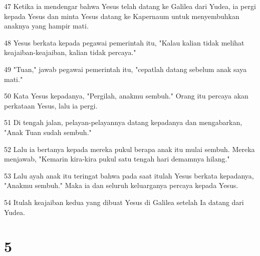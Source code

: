 \par 47 Ketika ia mendengar bahwa Yesus telah datang ke Galilea dari Yudea, ia pergi kepada Yesus dan minta Yesus datang ke Kapernaum untuk menyembuhkan anaknya yang hampir mati.
\par 48 Yesus berkata kepada pegawai pemerintah itu, "Kalau kalian tidak melihat keajaiban-keajaiban, kalian tidak percaya."
\par 49 "Tuan," jawab pegawai pemerintah itu, "cepatlah datang sebelum anak saya mati."
\par 50 Kata Yesus kepadanya, "Pergilah, anakmu sembuh." Orang itu percaya akan perkataan Yesus, lalu ia pergi.
\par 51 Di tengah jalan, pelayan-pelayannya datang kepadanya dan mengabarkan, "Anak Tuan sudah sembuh."
\par 52 Lalu ia bertanya kepada mereka pukul berapa anak itu mulai sembuh. Mereka menjawab, "Kemarin kira-kira pukul satu tengah hari demamnya hilang."
\par 53 Lalu ayah anak itu teringat bahwa pada saat itulah Yesus berkata kepadanya, "Anakmu sembuh." Maka ia dan seluruh keluarganya percaya kepada Yesus.
\par 54 Itulah keajaiban kedua yang dibuat Yesus di Galilea setelah Ia datang dari Yudea.

\chapter{5}

